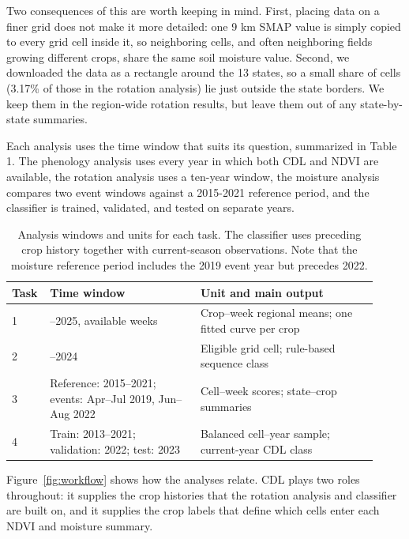 \documentclass[10pt,letterpaper]{article}
\begin{document}
Two consequences of this are worth keeping in mind. First, placing data on a finer grid does not make it more detailed: one 9 km SMAP value is simply copied to every grid cell inside it, so neighboring cells, and often neighboring fields growing different crops, share the same soil moisture value. Second, we downloaded the data as a rectangle around the 13 states, so a small share of cells (3.17\% of those in the rotation analysis) lie just outside the state borders. We keep them in the region-wide rotation results, but leave them out of any state-by-state summaries.

Each analysis uses the time window that suits its question, summarized in Table 1. The phenology analysis uses every year in which both CDL and NDVI are available, the rotation analysis uses a ten-year window, the moisture analysis compares two event windows against a 2015-2021 reference period, and the classifier is trained, validated, and tested on separate years.

\begin{table}[!htbp]
\centering\small
\begin{tabular}{@{}p{0.07\linewidth}>{\raggedright\arraybackslash}p{0.39\linewidth}>{\raggedright\arraybackslash}p{0.46\linewidth}@{}}
\toprule
Task & Time window & Unit and main output \\
\midrule
1 & 2008--2025, available weeks & Crop--week regional means; one fitted curve per crop \\
2 & 2015--2024 & Eligible grid cell; rule-based sequence class \\
3 & Reference: 2015--2021; events: Apr--Jul 2019, Jun--Aug 2022 & Cell--week scores; state--crop summaries \\
4 & Train: 2013--2021; validation: 2022; test: 2023 & Balanced cell--year sample; current-year CDL class \\
\bottomrule
\end{tabular}
\caption{Analysis windows and units for each task. The classifier uses preceding crop history together with current-season observations. Note that the moisture reference period includes the 2019 event year but precedes 2022.}
\label{tab:design}
\end{table}

Figure~\ref{fig:workflow} shows how the analyses relate. CDL plays two roles throughout: it supplies the crop histories that the rotation analysis and classifier are built on, and it supplies the crop labels that define which cells enter each NDVI and moisture summary.
\end{document}
